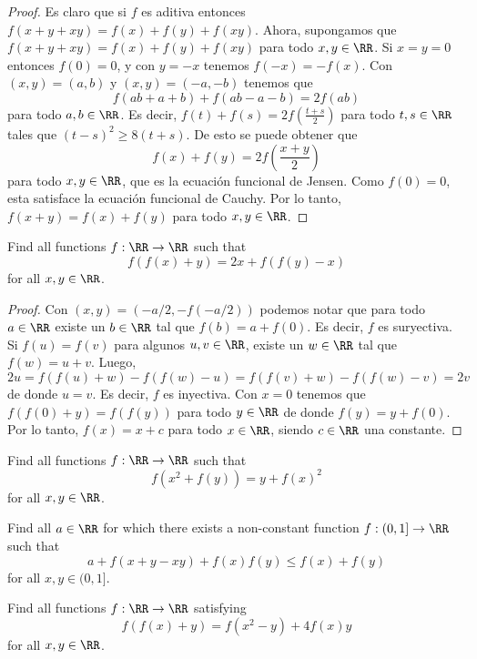\begin{proof}
	Es claro que si $f$ es aditiva entonces $f(x+y+xy)=f(x)+f(y)+f(xy)$. Ahora, supongamos que $f(x+y+xy)=f(x)+f(y)+f(xy)$ para todo $x,y\in\RR$. Si $x=y=0$ entonces $f(0)=0$, y con $y=-x$ tenemos $f(-x)=-f(x)$. Con $(x,y)=(a,b)$ y $(x,y)=(-a,-b)$ tenemos que
	\[f(ab+a+b)+f(ab-a-b)=2f(ab)\]
	para todo $a,b\in\RR$. Es decir, $f(t)+f(s)=2f\left(\frac{t+s}{2}\right)$ para todo $t,s\in\RR$ tales que $(t-s)^2\ge 8(t+s)$. De esto se puede obtener que
	\[f(x)+f(y)=2f\left(\frac{x+y}{2}\right)\]
	para todo $x,y\in\RR$, que es la ecuación funcional de Jensen. Como $f(0)=0$, esta satisface la ecuación funcional de Cauchy. Por lo tanto, $f(x+y)=f(x)+f(y)$ para todo $x,y\in\RR$.
\end{proof}

\begin{probEG}[ISL 2002/A1]
	Find all functions $f:\RR\to\RR$ such that
	\[f(f(x)+y)=2x+f(f(y)-x)\]
	for all $x,y\in\RR$.
\end{probEG}

\begin{proof}
	Con $(x,y)=(-a/2,-f(-a/2))$ podemos notar que para todo $a\in\RR$ existe un $b\in\RR$ tal que $f(b)=a+f(0)$. Es decir, $f$ es suryectiva. Si $f(u)=f(v)$ para algunos $u,v\in\RR$, existe un $w\in\RR$ tal que $f(w)=u+v$. Luego,
	\[2u=f(f(u)+w)-f(f(w)-u)=f(f(v)+w)-f(f(w)-v)=2v\]
	de donde $u=v$. Es decir, $f$ es inyectiva. Con $x=0$ tenemos que $f(f(0)+y)=f(f(y))$ para todo $y\in\RR$ de donde $f(y)=y+f(0)$. Por lo tanto, $f(x)=x+c$ para todo $x\in\RR$, siendo $c\in\RR$ una constante.
\end{proof}


\begin{probEG}
	Find all functions $f:\RR\to\RR$ such that
	\[f(x^2+f(y))=y+f(x)^2\]
	for all $x,y\in\RR$.
\end{probEG}

\begin{probEG}
	Find all $a\in\RR$ for which there exists a non-constant function $f:(0,1]\to\RR$ such that
	\[a+f(x+y-xy)+f(x)f(y)\le f(x)+f(y)\]
	for all $x,y\in(0,1]$.
\end{probEG}

\begin{probEG}
	Find all functions $f:\RR\to\RR$ satisfying
	\[f(f(x)+y)=f(x^2-y)+4f(x)y\]
	for all $x,y\in\RR$.
\end{probEG}

